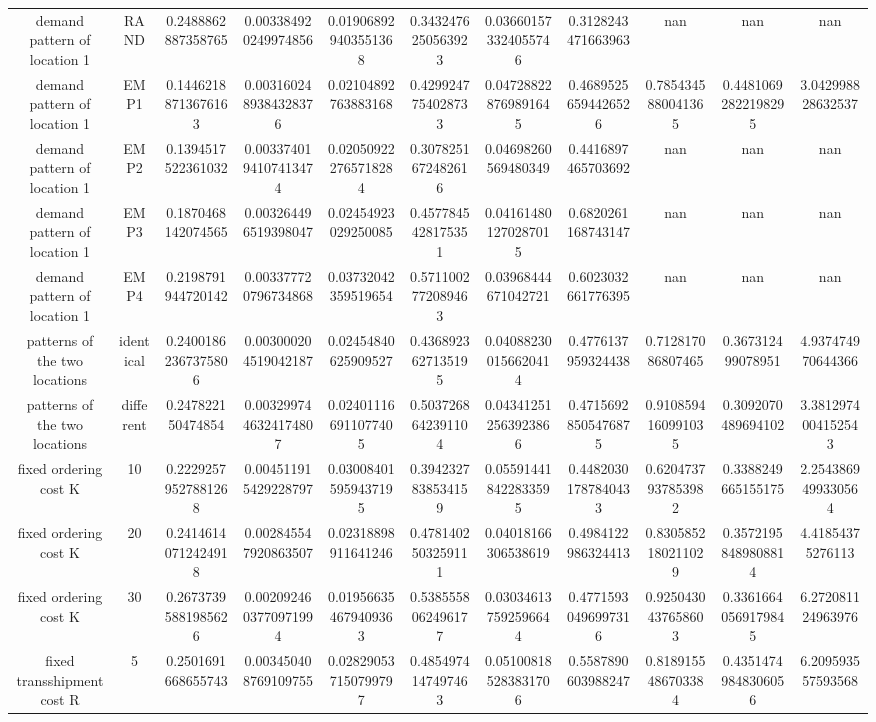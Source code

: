 \begin{table}[H]
\begin{tabular}{ccccccccccc}
demand pattern of location 1 & RAND & 0.2488862887358765 & 0.003384920249974856 & 0.019068929403551368 & 0.3432476250563923 & 0.036601573324055746 & 0.3128243471663963 & nan & nan & nan \\
demand pattern of location 1 & EMP1 & 0.14462188713676163 & 0.0031602489384328376 & 0.02104892763883168 & 0.4299247754028733 & 0.047288228769891645 & 0.46895256594426526 & 0.7854345880041365 & 0.44810692822198295 & 3.042998828632537 \\
demand pattern of location 1 & EMP2 & 0.1394517522361032 & 0.0033740194107413474 & 0.020509222765718284 & 0.3078251672482616 & 0.04698260569480349 & 0.4416897465703692 & nan & nan & nan \\
demand pattern of location 1 & EMP3 & 0.1870468142074565 & 0.003264496519398047 & 0.02454923029250085 & 0.4577845428175351 & 0.041614801270287015 & 0.6820261168743147 & nan & nan & nan \\
demand pattern of location 1 & EMP4 & 0.2198791944720142 & 0.003377720796734868 & 0.03732042359519654 & 0.5711002772089463 & 0.03968444671042721 & 0.6023032661776395 & nan & nan & nan \\
patterns of the two locations & identical & 0.24001862367375806 & 0.003000204519042187 & 0.02454840625909527 & 0.4368923627135195 & 0.040882300156620414 & 0.4776137959324438 & 0.712817086807465 & 0.367312499078951 & 4.937474970644366 \\
patterns of the two locations & different & 0.247822150474854 & 0.0032997446324174807 & 0.024011166911077405 & 0.5037268642391104 & 0.043412512563923866 & 0.47156928505476875 & 0.9108594160991035 & 0.3092070489694102 & 3.3812974004152543 \\
fixed ordering cost K & 10 & 0.22292579527881268 & 0.004511915429228797 & 0.030084015959437195 & 0.3942327838534159 & 0.055914418422833595 & 0.44820301787840433 & 0.6204737937853982 & 0.3388249665155175 & 2.2543869499330564 \\
fixed ordering cost K & 20 & 0.24146140712424918 & 0.002845547920863507 & 0.02318898911641246 & 0.4781402503259111 & 0.04018166306538619 & 0.4984122986324413 & 0.8305852180211029 & 0.35721958489808814 & 4.41854375276113 \\
fixed ordering cost K & 30 & 0.26737395881985626 & 0.0020924603770971994 & 0.019566354679409363 & 0.5385558062496177 & 0.030346137592596644 & 0.47715930496997316 & 0.9250430437658603 & 0.33616640569179845 & 6.272081124963976 \\
fixed transshipment cost R & 5 & 0.2501691668655743 & 0.003450408769109755 & 0.028290537150799797 & 0.4854974147497463 & 0.051008185283831706 & 0.5587890603988247 & 0.8189155486703384 & 0.43514749848306056 & 6.209593557593568 \\

\end{tabular}
\end{table}
